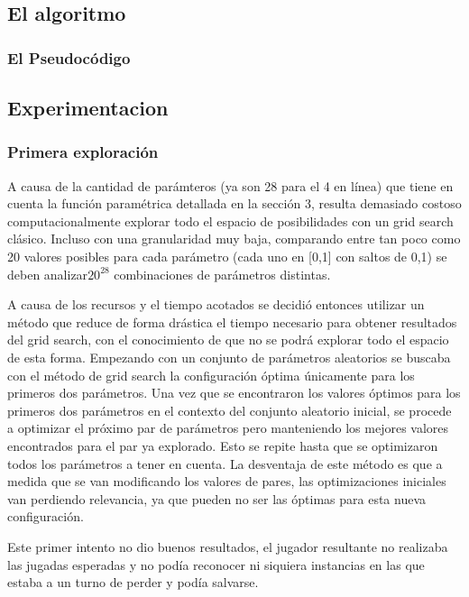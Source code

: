 \documentclass[A4paper,oneside,fleqn,11pt]{article}
\theoremstyle{definition}
\begin{document}
\subsection{El algoritmo}

\subsubsection{El Pseudocódigo}





\subsection{Experimentacion}

\subsubsection{Primera exploración}

A causa de la cantidad de parámteros (ya son 28 para el 4 en línea) que tiene en cuenta la función paramétrica detallada en la sección 3, resulta demasiado costoso computacionalmente explorar todo el espacio de posibilidades con un grid search clásico. Incluso  con una granularidad muy baja, comparando entre tan poco como 20 valores posibles para cada parámetro (cada uno en [0,1] con saltos de 0,1) se deben analizar$ 20^{28}$ combinaciones de parámetros distintas.

A causa de los recursos y el tiempo acotados se decidió entonces utilizar un método que reduce de forma drástica el tiempo necesario para obtener resultados del grid search, con el conocimiento de que no se podrá explorar todo el espacio de esta forma. Empezando con un conjunto de parámetros aleatorios se buscaba con el método de grid search la configuración óptima únicamente para los primeros dos parámetros. Una vez que se encontraron los valores óptimos para los primeros dos parámetros en el contexto del conjunto aleatorio inicial, se procede a optimizar el próximo par de parámetros pero manteniendo los mejores valores encontrados para el par ya explorado. Esto se repite hasta que se optimizaron todos los parámetros a tener en cuenta. La desventaja de este método es que a medida que se van modificando los valores de pares, las optimizaciones iniciales van perdiendo relevancia, ya que pueden no ser las óptimas para esta nueva configuración.

Este primer intento no dio buenos resultados, el jugador resultante no realizaba las jugadas esperadas y no podía reconocer ni siquiera instancias en las que estaba a un turno de perder y podía salvarse.
\end{document}

